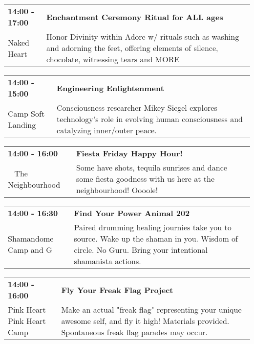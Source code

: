 \begin{tabular}{ p{1in} p{2.2in} }
    \textbf{14:00 - 17:00} & \textbf{Enchantment Ceremony Ritual for ALL ages} \\
    Naked Heart \newline  & Honor Divinity within Adore w/ rituals such as washing and adorning the feet, offering elements of silence, chocolate, witnessing tears and MORE \\
    \hline 
\end{tabular}
    
\begin{tabular}{ p{1in} p{2.2in} }
    \textbf{14:00 - 15:00} & \textbf{Engineering Enlightenment } \\
    Camp Soft Landing \newline  & Consciousness researcher Mikey Siegel explores technology's role in evolving human consciousness and catalyzing inner/outer peace. \\
    \hline 
\end{tabular}
    
\begin{tabular}{ p{1in} p{2.2in} }
    \textbf{14:00 - 16:00} & \textbf{Fiesta Friday Happy Hour!} \\
    ~ \newline The Neighbourhood & Some have shots, tequila sunrises and dance some fiesta goodness with us here at the neighbourhood! Oooole! \\
    \hline 
\end{tabular}
    
\begin{tabular}{ p{1in} p{2.2in} }
    \textbf{14:00 - 16:30} & \textbf{Find Your Power Animal 202} \\
    Shamandome Camp \newline 615 and G & Paired drumming healing journies take you to source. Wake up the shaman in you. Wisdom of circle. No Guru. Bring your intentional shamanista actions. \\
    \hline 
\end{tabular}
    
\begin{tabular}{ p{1in} p{2.2in} }
    \textbf{14:00 - 16:00} & \textbf{Fly Your Freak Flag Project} \\
    Pink Heart \newline Pink Heart Camp & Make an actual "freak flag" representing your unique awesome self, and fly it high! Materials provided. Spontaneous freak flag parades may occur. \\
    \hline 
\end{tabular}
    
